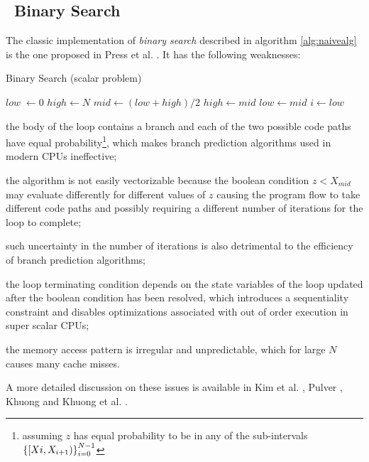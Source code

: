 \documentclass[preprint,1p,times]{elsarticle}
\begin{document}
\subsection{\ClassicName\ Binary Search}
\label{sec:binary}

The classic implementation of \textit{binary search} described in algorithm \ref{alg:naivealg} is the one proposed in Press et al. \cite{NRC++}. It has the following weaknesses: 

\begin{algorithm}
\caption{{\ClassicName}  Binary Search (scalar problem)}
\label{alg:naivealg}
\begin{algorithmic}
\State $low\; \leftarrow 0$
\State $high  \leftarrow N$
 
    \State $mid \leftarrow (low+high) / 2$
      
        \State $high \leftarrow mid$
    \Else
        \State $low \leftarrow mid$
    \EndIf
\EndWhile
\State $i \leftarrow low$
\EndFunction
\end{algorithmic}
\end{algorithm}

\begin{myitemize}
	\item the body of the loop contains a branch and each of the two possible code paths have equal probability\footnote{assuming $z$ has equal probability to be in any of the sub-intervals $\left \{ [X{i},X_{i+1}) \right \}_{i=0}^{N-1}$}, which makes branch prediction algorithms used in modern CPUs ineffective; 
	\item the algorithm is not easily vectorizable because the boolean condition $z<X_{mid}$ may evaluate differently for different values of $z$ causing the program flow to take different code paths and possibly requiring a different number of iterations for the loop to complete;
	\item such uncertainty in the number of iterations is also detrimental to the efficiency of branch prediction algorithms;
    \item the loop terminating condition depends on the state variables of the loop updated after the boolean condition has been resolved, which introduces a sequentiality constraint and disables optimizations associated with out of order execution in super scalar CPUs;
    \item the memory access pattern is irregular and unpredictable, which for large $N$ causes many cache misses.
\end{myitemize}
A more detailed discussion on these issues is available in Kim et al. \cite{Kim2011}, Pulver \cite{Pulver2011}, Khuong \cite{Khuong2012} and Khuong et al. \cite{Morin2015}.
\end{document}
